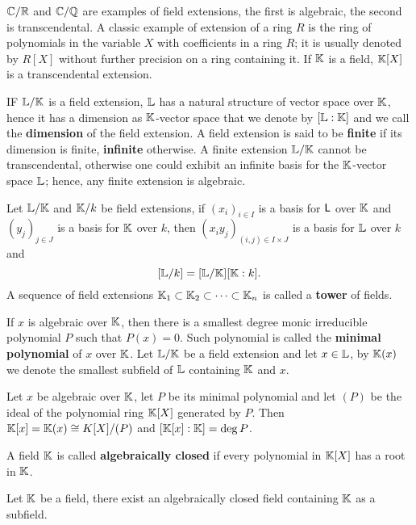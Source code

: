 $\mathbb{C}/\mathbb{R}$ and $\mathbb{C}/\mathbb{Q}$ are examples of field extensions, the first is
algebraic, the second is transcendental. A classic example of
extension of a ring $R$ is the ring of polynomials in the variable $X$
with coefficients in a ring $R$; it is usually denoted by $R[X]$
without further precision on a ring containing it. If $\mathbb{K}$ is a field,
$\mathbb{K}[X]$ is a transcendental extension.

IF $\mathbb{L}/\mathbb{K}$ is a field extension, $\mathbb{L}$ has a natural structure of
vector space over $\mathbb{K}$, hence it has a dimension as $\mathbb{K}$-vector space
that we denote by $[\mathbb{L}:\mathbb{K}]$ and we call the
\textbf{dimension} of the field
extension. A field extension is said to be
\textbf{finite} if its dimension is
finite, \textbf{infinite} otherwise. A
finite extension $\mathbb{L}/\mathbb{K}$ cannot be transcendental, otherwise one
could exhibit an infinite basis for the $\mathbb{K}$-vector space $\mathbb{L}$;
hence, any finite extension is algebraic.

Let $\mathbb{L}/\mathbb{K}$ and $\mathbb{K}/k$ be field extensions, if $(x_i)_{i\in I}$ is a
basis for $\mathsf{L}$ over $\mathbb{K}$ and $(y_j)_{j\in J}$ is a basis for $\mathbb{K}$ over
$k$, then $(x_iy_j)_{(i,j)\in I\times J}$ is a basis for $\mathbb{L}$ over $k$ and
\[[\mathbb{L}/k] = [\mathbb{L}/\mathbb{K}][\mathbb{K}:k] \text{.}\] A sequence of field extensions
$\mathbb{K}_1\subset\mathbb{K}_2\subset\cdots\subset\mathbb{K}_n$ is called a
 \textbf{tower} of
fields.

If $x$ is algebraic over $\mathbb{K}$, then there is a smallest degree monic
irreducible polynomial $P$ such that $P(x)=0$. Such polynomial is
called the \textbf{minimal polynomial} of
$x$ over $\mathbb{K}$.  Let $\mathbb{L}/\mathbb{K}$ be a field extension and let $x\in\mathbb{L}$,
by $\mathbb{K}(x)$ we denote the smallest subfield of $\mathbb{L}$ containing $\mathbb{K}$
and $x$.

\begin{proposition}
  Let $x$ be algebraic over $\mathbb{K}$, let $P$ be its minimal polynomial
  and let $(P)$ be the ideal of the polynomial ring $\mathbb{K}[X]$ generated
  by $P$. Then $\mathbb{K}[x]=\mathbb{K}(x)\cong K[X]/(P)$ and $[\mathbb{K}[x]:\mathbb{K}] = \deg P$.
\end{proposition}

A field $\mathbb{K}$ is called
\textbf{algebraically closed} if every polynomial in $\mathbb{K}[X]$ has a
root in $\mathbb{K}$.

\begin{theorem}
  Let $\mathbb{K}$ be a field, there exist an algebraically closed field
  containing $\mathbb{K}$ as a subfield.
\end{theorem}

